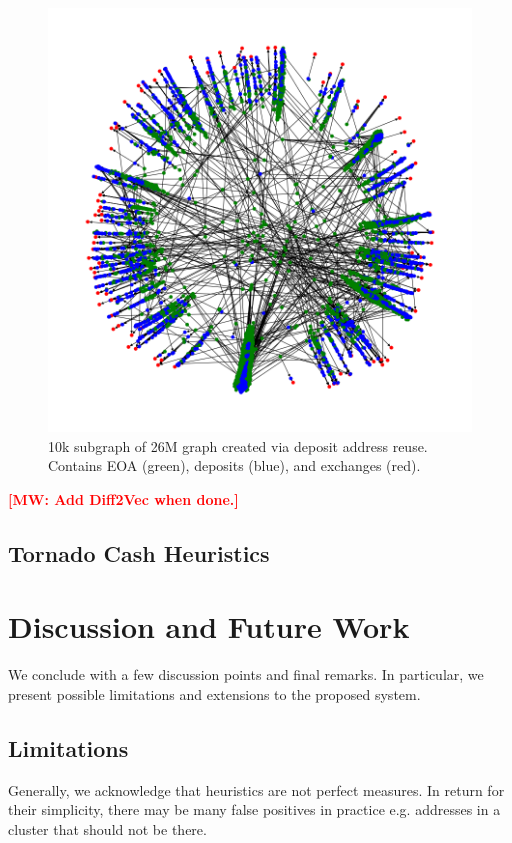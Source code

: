 \documentclass[11pt,a4paper]{article}
\newcommand{\mike}[1]{\textcolor{red}{\bf [MW: #1]}}
\begin{document}
\begin{figure}[h!]
\includegraphics[width=\linewidth]{figures/dar_graph.png}
\caption{10k subgraph of 26M graph created via deposit address reuse. Contains EOA (green), deposits (blue), and exchanges (red).}
\label{fig:dargraph}
\end{figure}

\mike{Add Diff2Vec when done.}

\subsection{Tornado Cash Heuristics}

\section{Discussion and Future Work}

We conclude with a few discussion points and final remarks. In particular, we present possible limitations and extensions to the proposed system.

\subsection{Limitations}

Generally, we acknowledge that heuristics are not perfect measures. In return for their simplicity, there may be many false positives in practice e.g. addresses in a cluster that should not be there.
\end{document}
